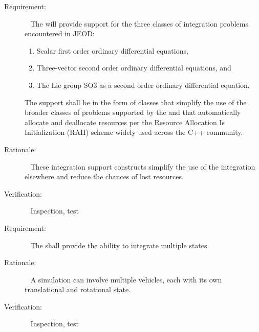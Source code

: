  \label{reqt:integration_problems} \begin{description} \item[Requirement:]\ \newline
 The \ModelDesc will provide support for the three classes
 of integration problems encountered in JEOD:
 \begin{enumerate}
   \item Scalar first order ordinary differential equations,
   \item Three-vector second order ordinary differential equations, and
   \item The Lie group SO3 as a second order ordinary differential equation.
 \end{enumerate}
 The support shall be in the form of classes that simplify the use of
 the broader classes of problems supported by the \erseven and
 that automatically allocate and deallocate resources per the
 Resource Allocation Is Initialization (RAII) scheme widely used
 across the C++ community.

\item[Rationale:]\ \newline
 These integration support constructs simplify the use of the
 integration elsewhere and reduce the chances of lost resources.

\item[Verification:]\ \newline
 Inspection, test
\end{description}


\label{reqt:multiple_states}
\begin{description}
\item[Requirement:]\ \newline
 The \ModelDesc shall provide the ability to integrate multiple states.

\item[Rationale:]\ \newline
 A simulation can involve multiple vehicles, each with its own translational
 and rotational state.

\item[Verification:]\ \newline
 Inspection, test
\end{description}


